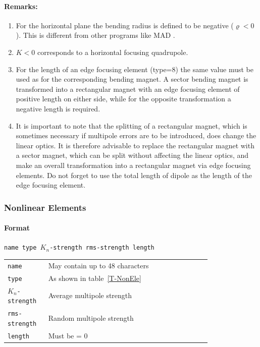 \paragraph{Remarks:}
\begin{enumerate}
    \item For the horizontal plane the bending radius is defined to be negative \mbox{($ \varrho < 0 $).} This is different from other programs like MAD \cite{MAD}.
    \item $ K < 0 $ corresponds to a horizontal focusing quadrupole.
    \item For the length of an edge focusing element (type=8) the same value must be used as for the corresponding bending magnet. A sector bending magnet is transformed into a rectangular magnet with an edge focusing element of positive length on either side, while for the opposite transformation a negative length is required.
    \item It is important to note that the splitting of a rectangular magnet, which is sometimes necessary if multipole errors are to be introduced, does change the linear optics. It is therefore advisable to replace the rectangular magnet with a sector magnet, which can be split without affecting the linear optics, and make an overall transformation into a rectangular magnet via edge focusing elements. Do not forget to use the total length of dipole as the length of the edge focusing element.
\end{enumerate}

\subsubsection{Nonlinear Elements} \label{NonEle}

\paragraph{Format} \texttt{name type $K_{n}$-strength rms-strength length}

\bigskip
\begin{tabular}{@{}lp{0.8\linewidth}}
    \texttt{name} & May contain up to 48 characters \\
    \texttt{type} & As shown in table~\ref{T-NonEle} \\
    \texttt{$K_{n}$-strength} & Average multipole strength \\
    \texttt{rms-strength} & Random multipole strength \\
    \texttt{length} & Must be = 0
\end{tabular}

